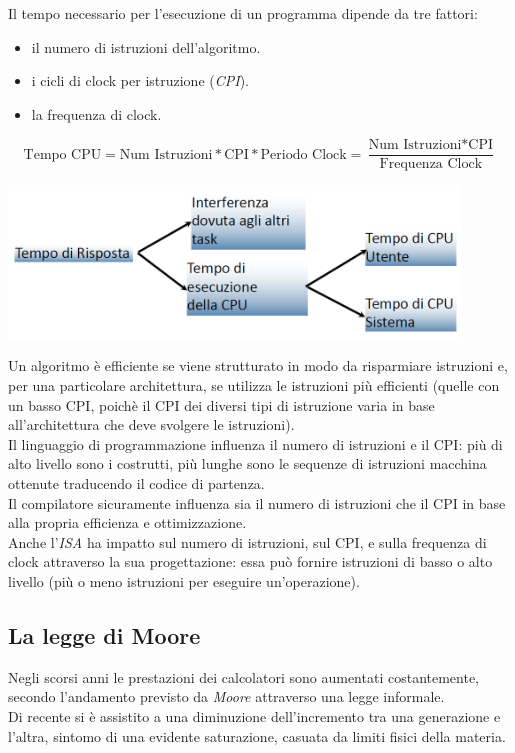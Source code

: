 Il tempo necessario per l'esecuzione di un programma dipende da tre fattori:
\begin{itemize}[nolistsep]
	\item il numero di istruzioni dell'algoritmo.
	\item i cicli di clock per istruzione (\textit{CPI}).
	\item la frequenza di clock.
\end{itemize}
\begin{equation*}
\text{Tempo CPU} = \text{Num Istruzioni} * \text{CPI} * \text{Periodo Clock} = \frac{\text{Num Istruzioni} * \text{CPI}}{\text{Frequenza Clock}}
\end{equation*}
\begin{center}
	\includegraphics[width=0.9\textwidth]{images/tempo_risposta.png}
\end{center}
Un algoritmo è efficiente se viene strutturato in modo da risparmiare istruzioni e, per una particolare architettura, se utilizza le istruzioni più efficienti (quelle con un basso CPI, poichè il CPI dei diversi tipi di istruzione varia in base all'architettura che deve svolgere le istruzioni).\\
Il linguaggio di programmazione influenza il numero di istruzioni e il CPI: più di alto livello sono i costrutti, più lunghe sono le sequenze di istruzioni macchina ottenute traducendo il codice di partenza.\\
Il compilatore sicuramente influenza sia il numero di istruzioni che il CPI in base alla propria efficienza e ottimizzazione.\\
Anche l'\textit{ISA} ha impatto sul numero di istruzioni, sul CPI, e sulla frequenza di clock attraverso la sua progettazione: essa può fornire istruzioni di basso o alto livello (più o meno istruzioni per eseguire un'operazione).

\subsection{La legge di Moore}
Negli scorsi anni le prestazioni dei calcolatori sono aumentati costantemente, secondo l'andamento previsto da \textit{Moore} attraverso una legge informale.\\
Di recente si è assistito a una diminuzione dell’incremento tra una generazione e l’altra, sintomo di una evidente saturazione, casuata da limiti fisici della materia.

